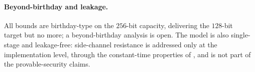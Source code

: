 \paragraph{Beyond-birthday and leakage.}
All bounds are birthday-type on the $256$-bit capacity, delivering the
$128$-bit target but no more; a beyond-birthday analysis is open. The model is
also single-stage and leakage-free: side-channel resistance is addressed only at
the implementation level, through the constant-time properties of
, and is not part of the provable-security claims.
